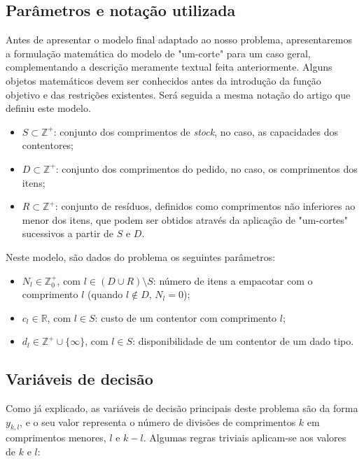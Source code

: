 \documentclass[12pt, a4paper, titlepage]{article}
\begin{document}
\subsection{Parâmetros e notação utilizada}

Antes de apresentar o modelo final adaptado ao nosso problema, apresentaremos a formulação
matemática do modelo de "um-corte"{} para um caso geral, complementando a descrição meramente
textual feita anteriormente. Alguns objetos matemáticos devem ser conhecidos antes da introdução da
função objetivo e das restrições existentes. Será seguida a mesma notação do artigo que definiu este
modelo. \cite{dyckhoff}

\begin{itemize}
    \item $S \subset \mathbb{\mathbb{Z}^+}$: conjunto dos comprimentos de \emph{stock}, no caso,
        as capacidades dos contentores;
    \item $D \subset \mathbb{\mathbb{Z}^+}$: conjunto dos comprimentos do pedido, no caso, os
        comprimentos dos
        itens;
    \item $R \subset \mathbb{\mathbb{Z}^+}$: conjunto de resíduos, definidos como comprimentos não
        inferiores ao menor dos itens, que podem ser obtidos através da aplicação de "um-cortes"{}
        sucessivos a partir de $S$ e $D$.
\end{itemize}

Neste modelo, são dados do problema os seguintes parâmetros:

\begin{itemize}
    \item $N_l \in \mathbb{Z}^+_0$, com $l \in (D \cup R) \setminus S$: número de itens a empacotar
        com o comprimento $l$ (quando $l \not \in D$, $N_l = 0$);
    \item $c_l \in \mathbb{R}$, com $l \in S$: custo de um contentor com comprimento $l$;
    \item $d_l \in \mathbb{Z}^+ \cup \{ \infty \}$, com $l \in S$: disponibilidade de um contentor
        de um dado tipo.
\end{itemize}

\subsection{Variáveis de decisão}

Como já explicado, as variáveis de decisão principais deste problema são da forma $y_{k, l}$, e o
seu valor representa o número de divisões de comprimentos $k$ em comprimentos menores, $l$ e
$k - l$. Algumas regras triviais aplicam-se aos valores de $k$ e $l$:
\end{document}
